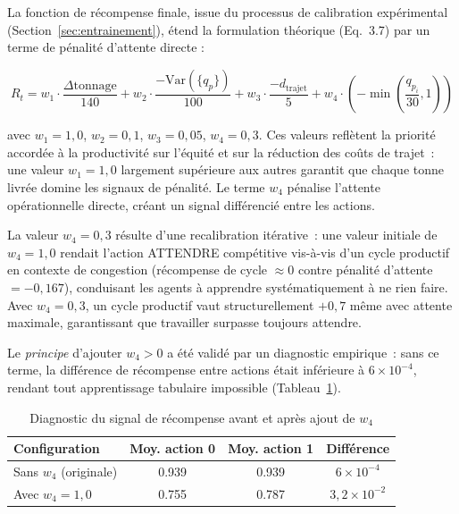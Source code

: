 \documentclass[11pt,a4paper]{report}
\begin{document}
La fonction de récompense finale, issue du processus de calibration expérimental (Section~\ref{sec:entrainement}), étend la formulation théorique (Eq.~3.7) par un terme de pénalité d'attente directe :

\begin{equation}
    R_t = w_1 \cdot \frac{\Delta \text{tonnage}}{140}
        + w_2 \cdot \frac{-\text{Var}(\{q_p\})}{100}
        + w_3 \cdot \frac{-d_{\text{trajet}}}{5}
        + w_4 \cdot \left(-\min\!\left(\frac{q_{p_i}}{30}, 1\right)\right)
    \label{eq:reward-impl}
\end{equation}

avec $w_1 = 1{,}0$, $w_2 = 0{,}1$, $w_3 = 0{,}05$, $w_4 = 0{,}3$.  Ces valeurs reflètent la priorité accordée à la productivité sur l'équité et sur la réduction des coûts de trajet~: une valeur $w_1 = 1{,}0$ largement supérieure aux autres garantit que chaque tonne livrée domine les signaux de pénalité. Le terme $w_4$ pénalise l'attente opérationnelle directe, créant un signal différencié entre les actions.

La valeur $w_4 = 0{,}3$ résulte d'une recalibration itérative~: une valeur initiale de $w_4 = 1{,}0$ rendait l'action ATTENDRE compétitive vis-à-vis d'un cycle productif en contexte de congestion (récompense de cycle $\approx 0$ contre pénalité d'attente $= -0{,}167$), conduisant les agents à apprendre systématiquement à ne rien faire.  Avec $w_4 = 0{,}3$, un cycle productif vaut structurellement $+0{,}7$ même avec attente maximale, garantissant que travailler surpasse toujours attendre.

Le \emph{principe} d'ajouter $w_4 > 0$ a été validé par un diagnostic empirique~: sans ce terme, la différence de récompense entre actions était inférieure à $6 \times 10^{-4}$, rendant tout apprentissage tabulaire impossible (Tableau~\ref{tab:diagnostic-reward}).

\begin{table}[H]
\centering
\caption{Diagnostic du signal de récompense avant et après ajout de $w_4$}
\label{tab:diagnostic-reward}
\begin{tabular}{lccc}
\toprule
\textbf{Configuration} & \textbf{Moy. action 0} & \textbf{Moy. action 1} & \textbf{Différence} \\
\midrule
Sans $w_4$ (originale) & 0.939 & 0.939 & $6 \times 10^{-4}$ \\
Avec $w_4 = 1{,}0$ & 0.755 & 0.787 & $3{,}2 \times 10^{-2}$ \\
\bottomrule
\end{tabular}
\end{table}
\end{document}
